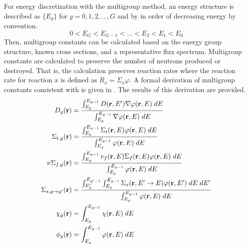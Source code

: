   For energy discretization with the multigroup method, an energy structure is 
  described as $\{E_g\}$ for $g = 0,1,2,\ldots,G$ and by in order of decreasing 
  energy by convention.
  \[ 0 < E_G < E_{G-1} < \ldots < E_2 < E_1 < E_0 \]
  Then, multigroup constants can be calculated based on the energy group 
  structure, known cross sections, and a representative flux spectrum.
  Multigroup constants are calculated to preserve the number of neutrons 
  produced or destroyed. That is, the calculation preserves reaction rates where
  the reaction rate for reaction $x$ is defined as $R_x=\Sigma_x \varphi$. 
  A formal derivation of multigroup constants consistent with
   is given in \cite{duderstathamilton}. The
  results of this derivation are provided.
  \begin{align}
    D_g(\mathbf{r}) &= \frac{\int_{E_g}^{E_{g-1}} D(\mathbf{r},E') \mathbf{\nabla} \varphi(\mathbf{r},E)\;dE}
      {\int_{E_g}^{E_{g-1}} \mathbf{\nabla} \varphi(\mathbf{r},E)\;dE} \\
    \Sigma_{t,g}(\mathbf{r}) &= \frac{\int_{E_g}^{E_{g-1}} \Sigma_t(\mathbf{r},E) 
      \varphi(\mathbf{r},E)\;dE}{\int_{E_g}^{E_{g-1}} \varphi(\mathbf{r},E)\;dE} \\
    \nu\Sigma_{f,g}(\mathbf{r}) &= \frac{\int_{E_g}^{E_{g-1}} \nu_f(\mathbf{r},E)
      \Sigma_f(\mathbf{r},E) \varphi(\mathbf{r},E)\;dE}{\int_{E_g}^{E_{g-1}} 
      \varphi(\mathbf{r},E)\;dE} \\
    \Sigma_{s,g\rightarrow g'}(\mathbf{r}) &= \frac{\int_{E_g'}^{E_{g'-1}} 
      \int_{E_g}^{E_{g-1}} \Sigma_s(\mathbf{r},E' \rightarrow E) 
      \varphi(\mathbf{r},E')\;dE\;dE'}
      {\int_{E_g}^{E_{g-1}} \varphi(\mathbf{r},E)\;dE}  \\
    \chi_g(\mathbf{r}) &= \int_{E_g}^{E_{g-1}} \chi(\mathbf{r},E) \; dE \\
    \phi_g(\mathbf{r}) &= \int_{E_g}^{E_{g-1}} \varphi(\mathbf{r},E) \; dE
  \end{align}

